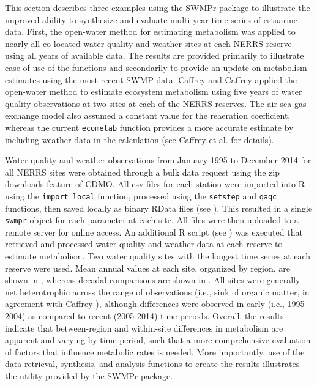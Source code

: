 \documentclass[10pt,letterpaper]{article}\usepackage[]{graphicx}\usepackage[]{color}
\begin{document}
This section describes three examples using the SWMPr package to illustrate the improved ability to synthesize and evaluate multi-year time series of estuarine data. First, the open-water method for estimating metabolism was applied to nearly all co-located water quality and weather sites at each \gls{NERRS} reserve using all years of available data.  The results are provided primarily to illustrate ease of use of the functions and secondarily to provide an update on metabolism estimates using the most recent \gls{SWMP} data.  Caffrey \cite{Caffrey03} and Caffrey \cite{Caffrey04} applied the open-water method to estimate ecosystem metabolism using five years of water quality observations at two sites at each of the \gls{NERRS} reserves.  The air-sea gas exchange model also assumed a constant value for the reaeration coefficient, whereas the current \texttt{ecometab} function provides a more accurate estimate by including weather data in the calculation (see Caffrey et al. \cite{Caffrey14} for details).

Water quality and weather observations from January 1995 to December 2014 for all \gls{NERRS} sites were obtained through a bulk data request using the zip downloads feature of \gls{CDMO}.  All csv files for each station were imported into R using the \texttt{import\_local} function, processed using the \texttt{setstep} and \texttt{qaqc} functions, then saved locally as binary RData files (see ). This resulted in a single \texttt{swmpr} object for each parameter at each site.  All files were then uploaded to a remote server for online access.  An additional R script (see ) was executed that retrieved and processed water quality and weather data at each reserve to estimate metabolism.  Two water quality sites with the longest time series at each reserve were used.  Mean annual values at each site, organized by region, are shown in , whereas decadal comparisons are shown in .  All sites were generally net heterotrophic across the range of observations (i.e., sink of organic matter, in agreement with Caffrey \cite{Caffrey03}), although differences were observed in early (i.e., 1995-2004) as compared to recent (2005-2014) time periods. Overall, the results indicate that between-region and within-site differences in metabolism are apparent and varying by time period, such that a more comprehensive evaluation of factors that influence metabolic rates is needed.  More importantly, use of the data retrieval, synthesis, and analysis functions to create the results illustrates the utility provided by the SWMPr package.
\end{document}
